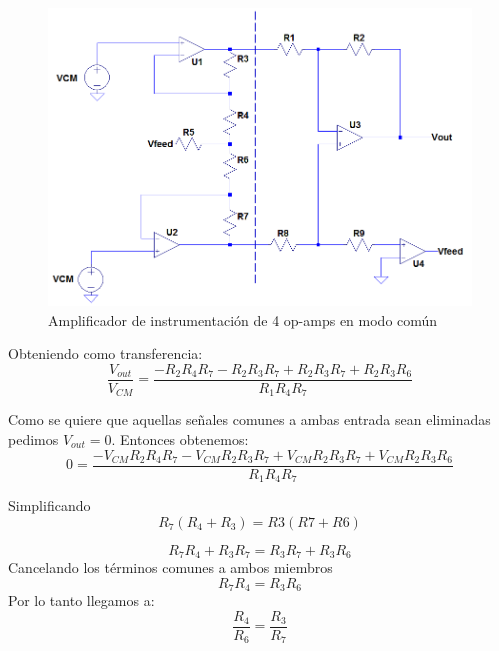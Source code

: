 \documentclass[a4paper]{article}
\begin{document}
	\begin{figure}[H]
		\centering
		\includegraphics[width=\linewidth]{../ImagenesVarias/inAmpVCM.png}
		\caption{Amplificador de instrumentación de 4 op-amps en modo común}
	\end{figure}
	Obteniendo como transferencia:
	\begin{equation}
		\frac{V_{out}}{V_{CM}}=
		\frac{-R_2 R_4 R_7 - 
			R_2 R_3 R_7 +
			R_2 R_3 R_7+
			R_2 R_3 R_6
		}{R_1 R_4 R_7}
	\end{equation}
		
	Como se quiere que aquellas señales comunes a ambas entrada sean eliminadas pedimos $V_{out}=0$.
	Entonces obtenemos:
		\begin{equation}
		 0=\frac{-V_{CM} R_2 R_4 R_7 - 
				V_{CM} R_2 R_3 R_7 +
				V_{CM} R_2 R_3 R_7+
				V_{CM} R_2 R_3 R_6
			}{R_1 R_4 R_7} 
		\end{equation}
	
	Simplificando
	\begin{equation}
		R_7(R_4+R_3)=R3(R7+R6)
	\end{equation}
	
	\begin{equation}
		R_7R_4+ R_3R_7=R_3R_7+R_3R_6
	\end{equation}
	Cancelando los términos comunes a ambos miembros
	\begin{equation}
		R_7R_4=R_3R_6
	\end{equation}
	Por lo tanto llegamos a:
	\begin{equation}
		\frac{R_4}{R_6}=\frac{R_3}{R_7}  %
	\end{equation}
\end{document}
